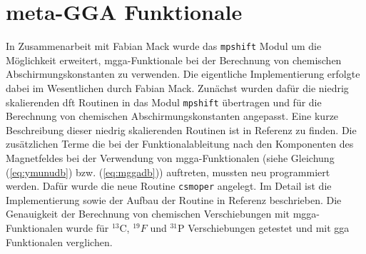 \section{meta-GGA Funktionale}
In Zusammenarbeit mit Fabian Mack wurde das \texttt{mpshift} Modul um die Möglichkeit erweitert, \ac{mgga}-Funktionale bei der Berechnung von chemischen Abschirmungskonstanten zu verwenden. Die eigentliche Implementierung erfolgte dabei im Wesentlichen durch Fabian Mack. Zunächst wurden dafür die niedrig skalierenden \ac{dft} Routinen in das Modul \texttt{mpshift} übertragen und für die Berechnung von chemischen Abschirmungskonstanten angepasst. Eine kurze Beschreibung dieser niedrig skalierenden Routinen ist in Referenz \cite{deglmann2002efficient} zu finden. Die zusätzlichen Terme die bei der Funktionalableitung nach den Komponenten des Magnetfeldes bei der Verwendung von \ac{mgga}-Funktionalen (siehe Gleichung (\ref{eq:ymunudb}) bzw. (\ref{eq:mggadb})) auftreten, mussten neu programmiert werden. Dafür wurde die neue Routine \texttt{csmoper} angelegt. Im Detail ist die Implementierung sowie der Aufbau der Routine in Referenz \cite{mack2017} beschrieben. Die Genauigkeit der Berechnung von chemischen Verschiebungen mit \ac{mgga}-Funktionalen wurde für $^{13}$C, $^{19}F$ und $^{31}$P Verschiebungen getestet und mit \ac{gga} Funktionalen verglichen.\supercite{reiter2017calculation} 
	
	